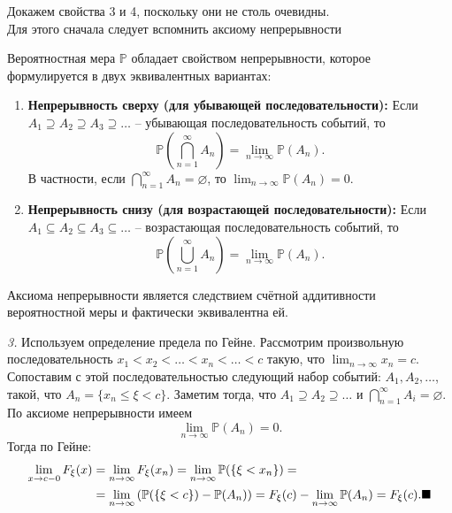 Докажем свойства 3 и 4, поскольку они не столь очевидны.\\

Для этого сначала следует вспомнить аксиому непрерывности
\begin{definition}
Вероятностная мера $\mathbb{P}$ обладает свойством непрерывности, которое формулируется в двух эквивалентных вариантах:

\begin{enumerate}
    \item \textbf{Непрерывность сверху (для убывающей последовательности):} Если $A_1 \supseteq A_2 \supseteq A_3 \supseteq \ldots$ -- убывающая последовательность событий, то
    \[
    \mathbb{P}\!\left(\bigcap_{n=1}^{\infty} A_n\right) = \lim_{n \to \infty} \mathbb{P}(A_n).
    \]
    В частности, если $\bigcap_{n=1}^{\infty} A_n = \varnothing$, то $\lim_{n \to \infty} \mathbb{P}(A_n) = 0$.

    \item \textbf{Непрерывность снизу (для возрастающей последовательности):} Если $A_1 \subseteq A_2 \subseteq A_3 \subseteq \ldots$ -- возрастающая последовательность событий, то
    \[
    \mathbb{P}\!\left(\bigcup_{n=1}^{\infty} A_n\right) = \lim_{n \to \infty} \mathbb{P}(A_n).
    \]
\end{enumerate}
\end{definition}

\begin{notice}
Аксиома непрерывности является следствием счётной аддитивности вероятностной меры и фактически эквивалентна ей.
\end{notice}

\textit{3.} Используем определение предела по Гейне. Рассмотрим произвольную последовательность $x_1 < x_2 < \ldots < x_n < \ldots < c$ такую, что $\lim_{n \to \infty} x_n = c$. Сопоставим с этой последовательностью следующий набор событий: $A_1, A_2, \ldots$, такой, что $A_n = \{x_n \leqslant \xi < c\}$. Заметим тогда, что $A_1 \supseteq A_2 \supseteq \ldots$ и $\bigcap_{n=1}^{\infty} A_i = \varnothing$. По аксиоме непрерывности имеем
\[
\lim_{n \to \infty} \mathbb{P}(A_n) = 0.
\]
Тогда по Гейне:
\begin{align*}
\lim_{x \to c-0} F_{\xi}(x) &= \lim_{n \to \infty} F_{\xi}(x_n) = \lim_{n \to \infty} \mathbb{P}(\{\xi < x_n\}) = \\
&= \lim_{n \to \infty} \left(\mathbb{P}(\{\xi < c\}) - \mathbb{P}(A_n)\right) = F_{\xi}(c) - \lim_{n \to \infty} \mathbb{P}(A_n) = F_{\xi}(c). \hfill \blacksquare
\end{align*}

